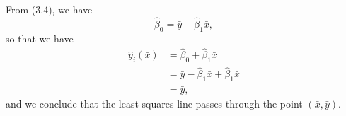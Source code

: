 
From (3.4), we have
\[
    \hat{\beta}_0 = \bar{y} - \hat{\beta}_1 \bar{x},
\]
so that we have 
\begin{equation*}
    \begin{split}
        \hat{y}_i(\bar{x}) &= \hat{\beta}_0 + \hat{\beta}_1 \bar{x} \\
                           &= \bar{y} - \hat{\beta}_1 \bar{x} + 
                            \hat{\beta}_1 \bar{x} \\
                           &= \bar{y},
    \end{split}
\end{equation*}
and we conclude that the least squares line passes through the point 
$(\bar{x}, \bar{y})$.
